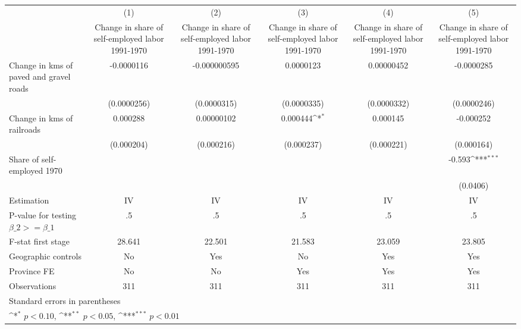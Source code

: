 {
\def\sym#1{\ifmmode^{#1}\else\(^{#1}\)\fi}
\begin{tabular}{l*{5}{c}}
\hline\hline
                    &\multicolumn{1}{c}{(1)}&\multicolumn{1}{c}{(2)}&\multicolumn{1}{c}{(3)}&\multicolumn{1}{c}{(4)}&\multicolumn{1}{c}{(5)}\\
                    &\multicolumn{1}{c}{Change in share of self-employed labor 1991-1970}&\multicolumn{1}{c}{Change in share of self-employed labor 1991-1970}&\multicolumn{1}{c}{Change in share of self-employed labor 1991-1970}&\multicolumn{1}{c}{Change in share of self-employed labor 1991-1970}&\multicolumn{1}{c}{Change in share of self-employed labor 1991-1970}\\
\hline
Change in kms of paved and gravel roads&  -0.0000116         &-0.000000595         &   0.0000123         &  0.00000452         &  -0.0000285         \\
                    & (0.0000256)         & (0.0000315)         & (0.0000335)         & (0.0000332)         & (0.0000246)         \\
[1em]
Change in kms of railroads&    0.000288         &  0.00000102         &    0.000444\sym{*}  &    0.000145         &   -0.000252         \\
                    &  (0.000204)         &  (0.000216)         &  (0.000237)         &  (0.000221)         &  (0.000164)         \\
[1em]
Share of self-employed 1970&                     &                     &                     &                     &      -0.593\sym{***}\\
                    &                     &                     &                     &                     &    (0.0406)         \\
\hline
Estimation          &          IV         &          IV         &          IV         &          IV         &          IV         \\
P-value for testing $\beta\_2 >= \beta\_1$&          .5         &          .5         &          .5         &          .5         &          .5         \\
F-stat first stage  &      28.641         &      22.501         &      21.583         &      23.059         &      23.805         \\
Geographic controls &          No         &         Yes         &          No         &         Yes         &         Yes         \\
Province FE         &          No         &          No         &         Yes         &         Yes         &         Yes         \\
Observations        &         311         &         311         &         311         &         311         &         311         \\
\hline\hline
\multicolumn{6}{l}{\footnotesize Standard errors in parentheses}\\
\multicolumn{6}{l}{\footnotesize \sym{*} \(p<0.10\), \sym{**} \(p<0.05\), \sym{***} \(p<0.01\)}\\
\end{tabular}
}
